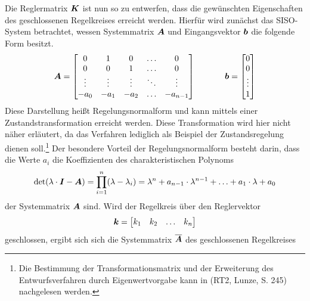 Die Reglermatrix $\boldsymbol{K}$ ist nun so zu entwerfen, dass die gewünschten Eigenschaften des geschlossenen Regelkreises erreicht werden. Hierfür wird zunächst das SISO-System  betrachtet, wessen Systemmatrix $\boldsymbol{A}$ und Eingangsvektor $\boldsymbol{b}$ die folgende Form besitzt.
\begin{equation}
\boldsymbol{A} = \begin{bmatrix}
0 & 1 & 0 & \hdots & 0 \\
0 & 0 & 1 & \hdots & 0 \\
\vdots & \vdots & \vdots & \ddots & \vdots \\
-a_{\text{0}} & -a_{\text{1}} & -a_{\text{2}} & \hdots & -a_{n-1}
\end{bmatrix}
\hspace{35pt}
\boldsymbol{b} = \begin{bmatrix}
0 \\ 0 \\ \vdots \\ 1
\end{bmatrix}
\end{equation}
Diese Darstellung heißt Regelungsnormalform und kann mittels einer Zustandstransformation erreicht werden. Diese Transformation wird hier nicht näher erläutert, da das Verfahren lediglich als Beispiel der Zustandsregelung dienen soll.\footnote{Die Bestimmung der Transformationsmatrix und der Erweiterung des Entwurfsverfahren durch Eigenwertvorgabe kann in (RT2, Lunze, S. 245) nachgelesen werden.} Der besondere Vorteil der Regelungsnormalform besteht darin, dass die Werte $a_i$ die Koeffizienten des charakteristischen Polynoms 
\begin{equation}
\text{det}(\lambda\cdot \boldsymbol{I}-\boldsymbol{A}) = \prod^n_{i=1} (\lambda-\lambda_i) = \lambda^n+a_{n-1}\cdot \lambda^{n-1} + \hdots + a_{\text{1}}\cdot \lambda + a_{\text{0}}
\end{equation}
der Systemmatrix $\boldsymbol{A}$ sind. Wird der Regelkreis über den Reglervektor
\begin{equation}
\boldsymbol{k} = \begin{bmatrix}
k_1 & k_2 & \hdots & k_n
\end{bmatrix}
\end{equation}
geschlossen, ergibt sich sich die  Systemmatrix $\boldsymbol{\overline{A}}$ des geschlossenen Regelkreises
